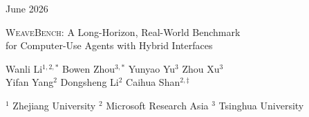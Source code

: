 \documentclass[11pt]{article}
\begin{document}
\thispagestyle{empty}

\noindent
\begin{minipage}[c]{0.5\linewidth}
\raggedright
\raisebox{-0.5\height}{\msftbrandmark}
\end{minipage}
\begin{minipage}[c]{0.49\linewidth}
\raggedleft
{\msftdatefont\small\color{msftgray}June 2026}
\end{minipage}\par
\vspace{0.35em}
\noindent{\color{msftline}\rule{\linewidth}{0.8pt}\par}

\vspace{1.0em}
\begin{center}
{{\msfttitlefont\fontsize{18}{22}\selectfont\color{msftdark}
\textsc{WeaveBench}: A Long-Horizon, Real-World Benchmark\\[0.1em]
for Computer-Use Agents with Hybrid Interfaces\par}}
\vspace{1.25em}

{\normalsize\rmfamily\color{msftdark}
Wanli Li$^{1,2,*}$ \hspace{0.9em}
Bowen Zhou$^{3,*}$ \hspace{0.9em}
Yunyao Yu$^{3}$ \hspace{0.9em}
Zhou Xu$^{3}$\\[0.35em]
Yifan Yang$^{2}$ \hspace{0.9em}
Dongsheng Li$^{2}$ \hspace{0.9em}
Caihua Shan$^{2,\ddagger}$\par
}
\vspace{0.32cm}

{\footnotesize\rmfamily\color{msftgray}
$^{1}$ Zhejiang University \quad
$^{2}$ Microsoft Research Asia \quad
$^{3}$ Tsinghua University\par
}
\end{center}
\end{document}
